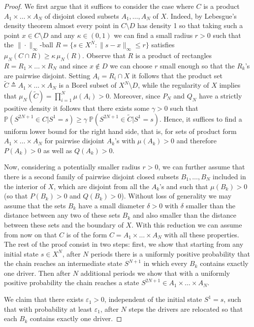 \documentclass[12pt,english]{article}
\newcommand{\PP}{\mathbb{P}}
\begin{document}
{\begin{proof}
We first argue that it suffices to consider the case where $C$ is a product $A_1 \times \ldots \times A_N$ of disjoint closed subsets $A_1,\ldots,A_N$ of $X$.
Indeed, by Lebesgue's density theorem almost every point in $C\setminus D$ has density 1 so that taking such a point $x \in C\setminus D$ and any $\kappa\in (0,1)$ we can find a small radius $r>0$ such that the $\|\cdot\|_\infty$-ball $R=\{s\in X^N:\|s-x\|_\infty\leq r\}$ satisfies 
$\mu_N(C \cap R) \geq \kappa\, \mu_N(R)$. Observe that $R$ is a product of rectangles $R=R_1 \times \ldots \times R_N$ and since $x\not\in D$ we can choose $r$ small enough so that the $R_k$'s are pairwise disjoint.
Setting $A_i=R_i\cap X$ it follows that the product set $\tilde C\triangleq A_1\times\ldots\times A_N$ 
is a Borel subset of $X^N\setminus D$, while
 the regularity of $X$ implies that $\mu_N(\tilde C)=\prod_{i=1}^N\mu(A_i)>0$.
Moreover, since $P_N$ and $Q_N$ have a strictly positive density it follows that  there exists some $\gamma>0$
such that
$\PP(S^{2N+1} \in C | S^1=s)\geq \gamma\; \PP(S^{2N+1} \in \tilde C | S^1=s)$. Hence, it suffices to find a uniform lower bound for the right hand side, that is,  for  sets  of product form $A_1\times\ldots\times A_N$
for pairwise disjoint $A_k$'s  with $\mu(A_k)>0$ and therefore $P(A_k)>0$ as well as $Q(A_k)>0$.

 Now, considering a potentially smaller radius $r>0$, we can further assume that there is a second family of pairwise disjoint closed subsets $B_1,\ldots,B_N$ included in the interior of $X$, which are disjoint from all the $A_k$'s and such that $\mu(B_k)>0$ (so that
$P(B_k)>0$ and $Q(B_k)>0$). Without loss of generality we may assume that the sets $B_k$ have a small diameter $\delta>0$ with $\delta$  smaller than the distance between any two of these sets $B_k$ and also smaller than the distance between these sets and  the boundary of $X$.
With this reduction we can assume from now on that $C$ is of the form $C=A_1 \times \ldots \times A_N$ with all these properties.
The rest of the proof consist in two steps: first, we show that starting from any initial state $s\in X^N$, after $N$ periods there is a uniformly positive probability that the chain reaches an intermediate state $S^{N+1}$ in which every $B_k$ contains exactly one driver. Then after $N$ additional periods we show that with a uniformly positive probability the chain reaches a state 
$S^{2N+1}\in A_1\times\ldots\times A_N$.

We claim that there exists $\varepsilon_1>0$, independent of the initial state $S^1=s$, such that with probability at least $\varepsilon_1$, after $N$ steps the drivers are relocated so that each $B_k$ contains exactly one driver.


\end{proof}}
\end{document}
